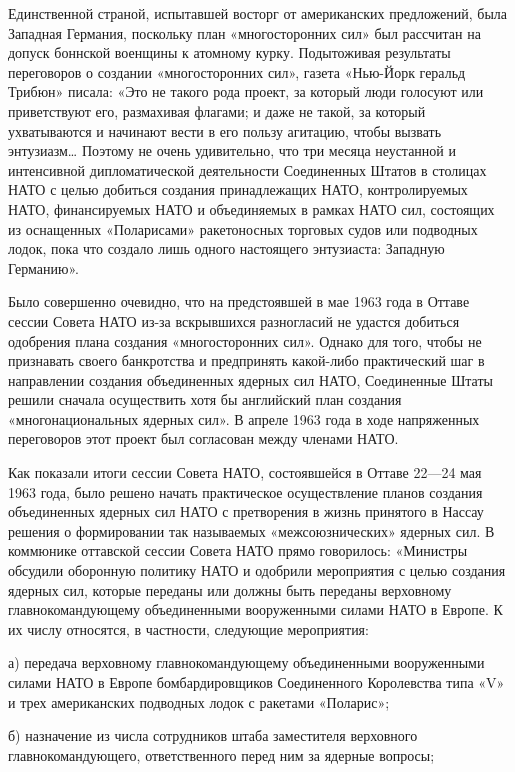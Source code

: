 \documentclass[12pt, a4paper, openany]{book}
\begin{document}
Единственной страной, испытавшей восторг от американских предложений, была Западная Германия, поскольку план «многосторонних сил» был рассчитан на допуск боннской военщины к атомному курку. Подытоживая результаты переговоров о создании «многосторонних сил», газета «Нью-Йорк геральд Трибюн» писала: «Это не такого рода проект, за который люди голосуют или приветствуют его, размахивая флагами; и даже не такой, за который ухватываются и начинают вести в его пользу агитацию, чтобы вызвать энтузиазм… Поэтому не очень удивительно, что три месяца неустанной и интенсивной дипломатической деятельности Соединенных Штатов в столицах НАТО с целью добиться создания принадлежащих НАТО, контролируемых НАТО, финансируемых НАТО и объединяемых в рамках НАТО сил, состоящих из оснащенных «Поларисами» ракетоносных торговых судов или подводных лодок, пока что создало лишь одного настоящего энтузиаста: Западную Германию».

Было совершенно очевидно, что на предстоявшей в мае 1963 года в Оттаве сессии Совета НАТО из-за вскрывшихся разногласий не удастся добиться одобрения плана создания «многосторонних сил». Однако для того, чтобы не признавать своего банкротства и предпринять какой-либо практический шаг в направлении создания объединенных ядерных сил НАТО, Соединенные Штаты решили сначала осуществить хотя бы английский план создания «многонациональных ядерных сил». В апреле 1963 года в ходе напряженных переговоров этот проект был согласован между членами НАТО.

Как показали итоги сессии Совета НАТО, состоявшейся в Оттаве 22—24 мая 1963 года, было решено начать практическое осуществление планов создания объединенных ядерных сил НАТО с претворения в жизнь принятого в Нассау решения о формировании так называемых «межсоюзнических» ядерных сил. В коммюнике оттавской сессии Совета НАТО прямо говорилось: «Министры обсудили оборонную политику НАТО и одобрили мероприятия с целью создания ядерных сил, которые переданы или должны быть переданы верховному главнокомандующему объединенными вооруженными силами НАТО в Европе. К их числу относятся, в частности, следующие мероприятия:

а) передача верховному главнокомандующему объединенными вооруженными силами НАТО в Европе бомбардировщиков Соединенного Королевства типа «V» и трех американских подводных лодок с ракетами «Поларис»;

б) назначение из числа сотрудников штаба заместителя верховного главнокомандующего, ответственного перед ним за ядерные вопросы;
\end{document}
